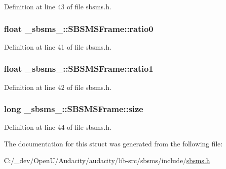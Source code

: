 Definition at line 43 of file sbsms.\+h.

\subsubsection[{\texorpdfstring{ratio0}{ratio0}}]{\setlength{\rightskip}{0pt plus 5cm}float \+\_\+sbsms\+\_\+\+::\+S\+B\+S\+M\+S\+Frame\+::ratio0}\hypertarget{struct__sbsms___1_1_s_b_s_m_s_frame_ac8e9101334b82a87c959efff3a1629b0}{}\label{struct__sbsms___1_1_s_b_s_m_s_frame_ac8e9101334b82a87c959efff3a1629b0}


Definition at line 41 of file sbsms.\+h.

\subsubsection[{\texorpdfstring{ratio1}{ratio1}}]{\setlength{\rightskip}{0pt plus 5cm}float \+\_\+sbsms\+\_\+\+::\+S\+B\+S\+M\+S\+Frame\+::ratio1}\hypertarget{struct__sbsms___1_1_s_b_s_m_s_frame_a37e83c5b5514f5f03e7dda5848d4318e}{}\label{struct__sbsms___1_1_s_b_s_m_s_frame_a37e83c5b5514f5f03e7dda5848d4318e}


Definition at line 42 of file sbsms.\+h.

\subsubsection[{\texorpdfstring{size}{size}}]{\setlength{\rightskip}{0pt plus 5cm}long \+\_\+sbsms\+\_\+\+::\+S\+B\+S\+M\+S\+Frame\+::size}\hypertarget{struct__sbsms___1_1_s_b_s_m_s_frame_a18247bf48653e54f978a72b5e8a568a5}{}\label{struct__sbsms___1_1_s_b_s_m_s_frame_a18247bf48653e54f978a72b5e8a568a5}


Definition at line 44 of file sbsms.\+h.



The documentation for this struct was generated from the following file\+:\begin{DoxyCompactItemize}
\item 
C\+:/\+\_\+dev/\+Open\+U/\+Audacity/audacity/lib-\/src/sbsms/include/\hyperlink{sbsms_8h}{sbsms.\+h}\end{DoxyCompactItemize}
